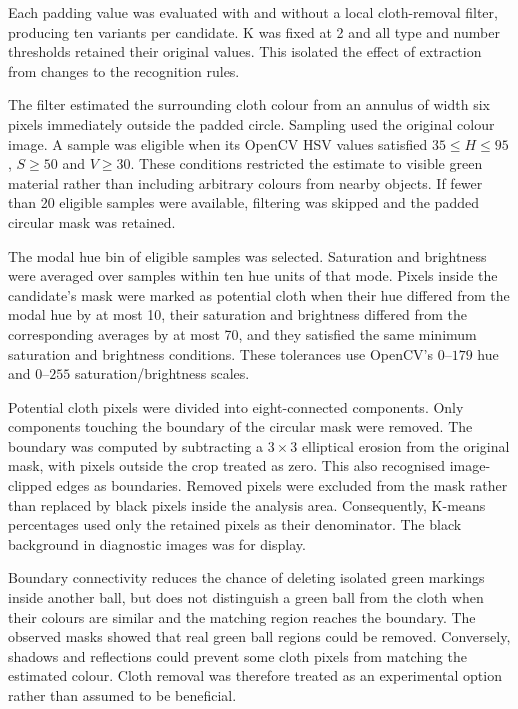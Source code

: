 Each padding value was evaluated with and without a local cloth-removal
filter, producing ten variants per candidate. K was fixed at 2 and all type
and number thresholds retained their original values. This isolated the effect
of extraction from changes to the recognition rules.

The filter estimated the surrounding cloth colour from an annulus of width
six pixels immediately outside the padded circle. Sampling used the original
colour image. A sample was eligible when its OpenCV HSV values satisfied
$35\leq H\leq95$, $S\geq50$ and $V\geq30$. These conditions restricted
the estimate to visible green material rather than including arbitrary
colours from nearby objects. If fewer than 20 eligible samples were available,
filtering was skipped and the padded circular mask was retained.

The modal hue bin of eligible samples was selected. Saturation and brightness
were averaged over samples within ten hue units of that mode. Pixels inside
the candidate's mask were marked as potential cloth when their hue differed
from the modal hue by at most 10, their saturation and brightness differed
from the corresponding averages by at most 70, and they satisfied the same
minimum saturation and brightness conditions. These tolerances use OpenCV's
$0$--$179$ hue and $0$--$255$ saturation/brightness scales.

Potential cloth pixels were divided into eight-connected components. Only
components touching the boundary of the circular mask were removed. The
boundary was computed by subtracting a $3\times3$ elliptical erosion from
the original mask, with pixels outside the crop treated as zero. This also
recognised image-clipped edges as boundaries. Removed pixels were excluded
from the mask rather than replaced by black pixels inside the analysis area.
Consequently, K-means percentages used only the retained pixels as their
denominator. The black background in diagnostic images was for display.

Boundary connectivity reduces the chance of deleting isolated green markings
inside another ball, but does not distinguish a green ball from the cloth
when their colours are similar and the matching region reaches the boundary.
The observed masks showed that real green ball regions could be removed.
Conversely, shadows and reflections could prevent some cloth pixels from
matching the estimated colour. Cloth removal was therefore treated as an
experimental option rather than assumed to be beneficial.

